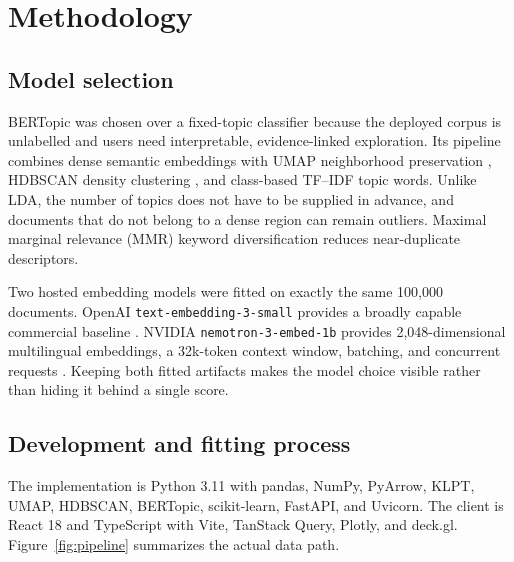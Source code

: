 \documentclass[11pt,a4paper]{article}
\begin{document}
\section{Methodology}

\subsection{Model selection}

BERTopic was chosen over a fixed-topic classifier because the deployed corpus
is unlabelled and users need interpretable, evidence-linked exploration. Its
pipeline combines dense semantic embeddings with UMAP neighborhood
preservation \parencite{mcinnes2018}, HDBSCAN density clustering
\parencite{campello2013}, and class-based TF--IDF topic words. Unlike LDA, the
number of topics does not have to be supplied in advance, and documents that
do not belong to a dense region can remain outliers. Maximal marginal relevance
(MMR) keyword diversification reduces near-duplicate descriptors.

Two hosted embedding models were fitted on exactly the same 100,000 documents.
OpenAI \texttt{text-embedding-3-small} provides a broadly capable commercial
baseline \parencite{openai2024embeddings}. NVIDIA
\texttt{nemotron-3-embed-1b} provides 2,048-dimensional multilingual
embeddings, a 32k-token context window, batching, and concurrent requests
\parencite{nvidia2025nemotron}. Keeping both fitted artifacts makes the model
choice visible rather than hiding it behind a single score.

\subsection{Development and fitting process}

The implementation is Python 3.11 with pandas, NumPy, PyArrow, KLPT, UMAP,
HDBSCAN, BERTopic, scikit-learn, FastAPI, and Uvicorn. The client is React 18
and TypeScript with Vite, TanStack Query, Plotly, and deck.gl.
Figure~\ref{fig:pipeline} summarizes the actual data path.
\end{document}
